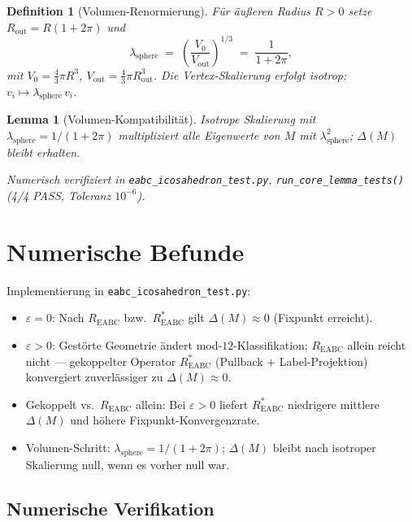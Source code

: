 \documentclass[11pt,a4paper]{article}
\newtheorem{definition}{Definition}
\newtheorem{lemma}{Lemma}
\begin{document}
\begin{definition}[Volumen-Renormierung]
Für äußeren Radius $R>0$ setze $R_{\mathrm{out}}=R(1+2\pi)$ und
\[
  \lambda_{\mathrm{sphere}}
  \;=\;
  \left(\frac{V_0}{V_{\mathrm{out}}}\right)^{\!1/3}
  \;=\;
  \frac{1}{1+2\pi},
\]
mit $V_0=\tfrac{4}{3}\pi R^3$, $V_{\mathrm{out}}=\tfrac{4}{3}\pi R_{\mathrm{out}}^3$.
Die Vertex-Skalierung erfolgt isotrop: $v_i\mapsto \lambda_{\mathrm{sphere}}\,v_i$.
\end{definition}

\begin{lemma}[Volumen-Kompatibilität]
Isotrope Skalierung mit $\lambda_{\mathrm{sphere}} = 1/(1+2\pi)$ multipliziert alle
Eigenwerte von $M$ mit $\lambda_{\mathrm{sphere}}^2$; $\Delta(M)$ bleibt erhalten.
\end{lemma}

\smallskip\noindent
\textit{Numerisch verifiziert in \texttt{eabc\_icosahedron\_test.py},
\texttt{run\_core\_lemma\_tests()} (4/4 PASS, Toleranz $10^{-6}$).}

\section{Numerische Befunde}

Implementierung in \texttt{eabc\_icosahedron\_test.py}:

\begin{itemize}
\item $\varepsilon=0$: Nach $R_{\mathrm{EABC}}$ bzw.\ $R^*_{\mathrm{EABC}}$
  gilt $\Delta(M)\approx 0$ (Fixpunkt erreicht).
\item $\varepsilon>0$: Gestörte Geometrie ändert mod-$12$-Klassifikation;
  $R_{\mathrm{EABC}}$ allein reicht nicht --- gekoppelter Operator $R^*_{\mathrm{EABC}}$
  (Pullback + Label-Projektion) konvergiert zuverlässiger zu $\Delta(M)\approx 0$.
\item Gekoppelt vs.\ $R_{\mathrm{EABC}}$ allein: Bei $\varepsilon>0$ liefert
  $R^*_{\mathrm{EABC}}$ niedrigere mittlere $\Delta(M)$ und höhere Fixpunkt-Konvergenzrate.
\item Volumen-Schritt: $\lambda_{\mathrm{sphere}}=1/(1+2\pi)$; $\Delta(M)$ bleibt
  nach isotroper Skalierung null, wenn es vorher null war.
\end{itemize}

\subsection{Numerische Verifikation}
\end{document}
